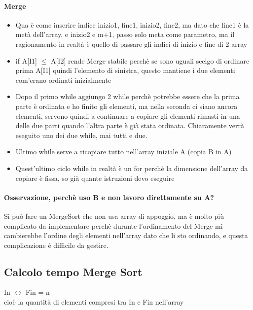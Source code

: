 \paragraph*{Merge}
\begin{itemize}
    \item Qua è come inserire indice inizio1, fine1, inizio2, fine2, ma dato che fine1 è la
     metà dell'array, e inizio2 e m+1, passo solo meta come parametro, ma il ragionamento in realtà è quello di passare
     gli indici di inizio e fine di 2 array
    \item if A[I1] $\leq$ A[I2] rende Merge stabile perchè se sono uguali scelgo di ordinare prima A[I1] quindi l'elemento
    di sinistra, questo mantiene i due elementi com'erano ordinati inizialmente
    \item Dopo il primo while aggiungo 2 while perchè potrebbe essere che la prima parte è ordinata e ho finito gli
    elementi, ma nella seconda ci siano ancora elementi, servono quindi a continuare a copiare gli elementi rimasti
    in una delle due parti quando l'altra parte è già stata ordinata. Chiaramente verrà eseguito uno dei due while, mai tutti
    e due.
    \item Ultimo while serve a ricopiare tutto nell'array iniziale A (copia B in A)
    \item Quest'ultimo ciclo while in realtà è un for perchè la dimensione dell'array da copiare è fissa, so già
    quante istruzioni devo eseguire
\end{itemize}
\paragraph*{Osservazione, perchè uso B e non lavoro direttamente su A?} Si può fare un MergeSort che non usa array
di appoggio, ma è molto più complicato da implementare perchè durante l'ordinamento del Merge mi cambierebbe
l'ordine degli elementi nell'array dato che li sto ordinando, e questa complicazione è difficile da gestire.
\subsection{Calcolo tempo Merge Sort}
In $\longleftrightarrow$ Fin = n\\
cioè la quantità di elementi compresi tra In e Fin nell'array
